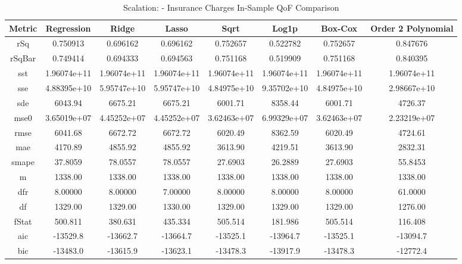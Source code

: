 \documentclass{article}
\begin{document}
\begin{table}[H]
\centering
\caption{Scalation: - Insurance Charges In-Sample QoF Comparison}
\label{tab:Scalation: - Insurance Charges In-Sample QoF Comparison}
\begin{tabular}{|c|c|c|c|c|c|c|c|} \hline 
Metric & Regression & Ridge & Lasso & Sqrt & Log1p &  Box-Cox & Order 2 Polynomial \\ \hline \hline 
rSq &0.750913 & 0.696162 &      0.696162 &      0.752657 &      0.522782 &      0.752657 &      0.847676 \\ \hline 
rSqBar &0.749414 &      0.694333 &      0.694563 &      0.751168 &      0.519909 &      0.751168 &      0.840395 \\ \hline 
sst &1.96074e+11 &      1.96074e+11 &   1.96074e+11 &   1.96074e+11 &   1.96074e+11 &   1.96074e+11 &   1.96074e+11 \\ \hline 
sse &4.88395e+10 &      5.95747e+10 &   5.95747e+10 &   4.84975e+10 &   9.35702e+10 &   4.84975e+10 &   2.98667e+10 \\ \hline 
sde &6043.94 &  6675.21 &       6675.21 &       6001.71 &       8358.44 &       6001.71 &       4726.37 \\ \hline 
mse0 &3.65019e+07 &     4.45252e+07 &   4.45252e+07 &   3.62463e+07 &   6.99329e+07 &   3.62463e+07 &   2.23219e+07 \\ \hline 
rmse &6041.68 & 6672.72 &       6672.72 &       6020.49 &       8362.59 &       6020.49 &       4724.61 \\ \hline 
mae &4170.89 &  4855.92 &       4855.92 &       3613.90 &       4219.51 &       3613.90 &       2832.31 \\ \hline 
smape &37.8059 &        78.0557 &       78.0557 &       27.6903 &       26.2889 &       27.6903 &       55.8453 \\ \hline 
m &1338.00 &    1338.00 &       1338.00 &       1338.00 &       1338.00 &       1338.00 &       1338.00 \\ \hline 
dfr &8.00000 &  8.00000 &       7.00000 &       8.00000 &       8.00000 &       8.00000 &       61.0000 \\ \hline 
df &1329.00 &   1329.00 &       1330.00 &       1329.00 &       1329.00 &       1329.00 &       1276.00 \\ \hline 
fStat &500.811 &        380.631 &       435.334 &       505.514 &       181.986 &       505.514 &       116.408 \\ \hline 
aic &-13529.8 & -13662.7 &      -13664.7 &      -13525.1 &      -13964.7 &      -13525.1 &      -13094.7 \\ \hline 
bic &-13483.0 & -13615.9 &      -13623.1 &      -13478.3 &      -13917.9 &      -13478.3 &      -12772.4 \\ \hline 
\end{tabular}
\end{table}
\end{document}
